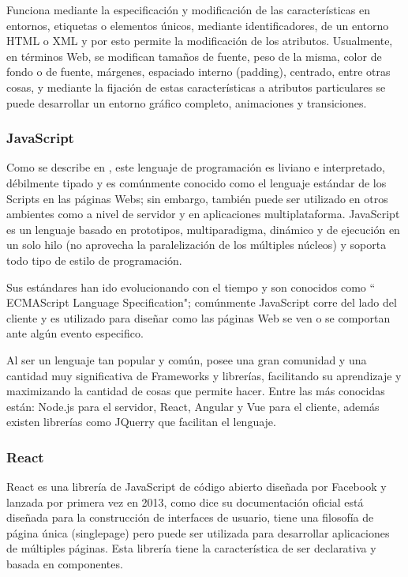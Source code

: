 Funciona mediante la especificación y modificación de las características en
entornos, etiquetas o elementos únicos, mediante identificadores, de un entorno
HTML o XML y por esto permite la modificación de los atributos.
Usualmente, en términos Web, se modifican tamaños de fuente, peso de la misma,
color de fondo o de fuente, márgenes, espaciado interno (padding), centrado,
entre otras cosas, y mediante la fijación de estas características a atributos
particulares se puede desarrollar un entorno gráfico completo, animaciones y
transiciones.

\subsubsection{JavaScript}

Como se describe en \textcite{JavaScript}, este lenguaje de programación es liviano e
interpretado, débilmente tipado y es comúnmente conocido como el lenguaje estándar
de los Scripts en las páginas Webs; sin embargo, también puede ser utilizado en
otros ambientes como a nivel de servidor y en aplicaciones multiplataforma.
JavaScript es un lenguaje basado en prototipos, multiparadigma, dinámico y de
ejecución en un solo hilo (no aprovecha la paralelización de los múltiples
núcleos) y soporta todo tipo de estilo de programación.

Sus estándares han ido evolucionando con el tiempo y son conocidos como
`` ECMAScript Language Specification"; comúnmente JavaScript corre del lado del
cliente y es utilizado para diseñar como las páginas Web se ven o se comportan
ante algún evento especifico.

Al ser un lenguaje tan popular y común, posee una gran comunidad y una cantidad
muy significativa de Frameworks  y librerías, facilitando su aprendizaje
y maximizando la cantidad de cosas que permite hacer. Entre las más conocidas
están: Node.js para el servidor, React, Angular y Vue para el cliente, además
existen librerías como JQuerry que facilitan el lenguaje.

\subsubsection{React}

React es una librería de JavaScript de código abierto diseñada por Facebook y
lanzada por primera vez en 2013, como dice su documentación oficial \textcite{React}
está diseñada para la construcción de interfaces de usuario, tiene una filosofía
de página única (singlepage) pero puede ser utilizada para desarrollar aplicaciones
de múltiples páginas. Esta librería tiene la característica de ser declarativa
y basada en componentes.

